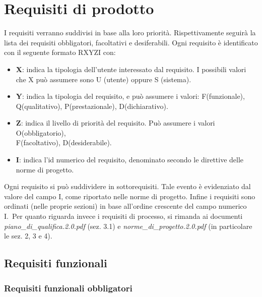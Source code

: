 \newpage\section{Requisiti di prodotto}
I requisiti verranno suddivisi in base alla loro priorità. Rispettivamente seguirà la lista dei requisiti obbligatori, facoltativi e desiferabili. Ogni requisito è identificato con il seguente formato RXYZI con:


		\begin{itemize}

			\item \textbf{X}: indica la tipologia dell'utente interessato dal requisito. I possibili valori che X può assumere sono U (utente) oppure S (sistema).

			\item \textbf{Y}: indica la tipologia del requisito, e può assumere i valori: F(funzionale), Q(qualitativo), P(prestazionale), D(dichiarativo).

			\item \textbf{Z}: indica il livello di priorità del requisito. Può assumere i valori O(obbligatorio), \\F(facoltativo), D(desiderabile).

			\item \textbf{I}: indica l'id numerico del requisito, denominato secondo le direttive delle norme di progetto.

		\end{itemize}


		Ogni requisito si può suddividere in sottorequisiti. Tale evento è evidenziato dal valore del campo I, come riportato nelle norme di progetto. Infine i requisiti sono ordinati (nelle proprie sezioni) in base all'ordine crescente del campo numerico I.\
Per quanto riguarda invece i requisiti di processo, si rimanda ai documenti \textit{piano\_di\_qualifica.2.0.pdf} (sez. 3.1) e \textit{norme\_di\_progetto.2.0.pdf} (in particolare le sez. 2, 3 e 4).

\subsection{Requisiti funzionali}


\subsubsection{Requisiti funzionali obbligatori}

